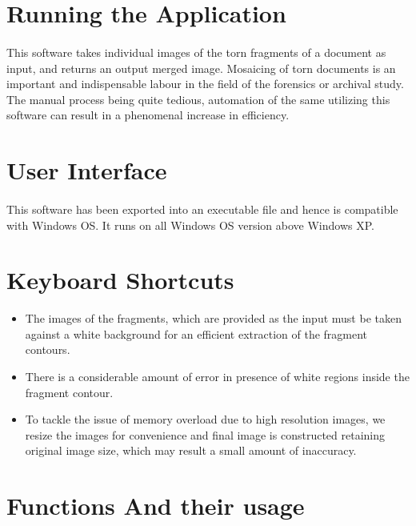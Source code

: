 \documentclass[a4paper,10pt]{scrreprt}
\begin{document}
\section{Running the Application}
\paragraph{}
This software takes individual images of the torn fragments of a document as input, and returns an output merged image. Mosaicing of torn documents is an important and indispensable labour in the field of the forensics or archival study. The manual process being quite tedious, automation of the same utilizing this software can result in a phenomenal increase in efficiency.



\section{User Interface}
\paragraph{}
This software has been exported into an executable file and hence is compatible with Windows OS. It runs on all Windows OS version above Windows XP.

\section{Keyboard Shortcuts}

\begin{itemize}

\item The images of the fragments, which are provided as the input must be taken against a white background for an efficient extraction of the fragment contours.

\item There is a considerable amount of error in presence of white regions inside the fragment contour.

\item To tackle the issue of memory overload due to high resolution images, we resize the images for convenience and final image is constructed retaining original image size, which may result a small amount of inaccuracy.

\end{itemize}
  

\section{Functions And their usage}
\end{document}
